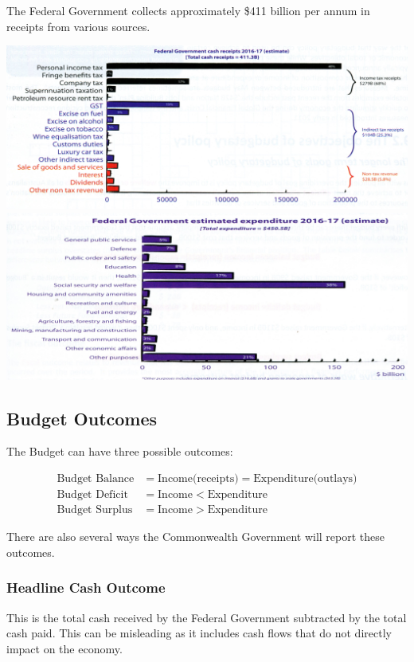 \documentclass[11pt]{article}
\begin{document}
The Federal Government collects approximately \$411 billion per annum
in receipts from various sources.

\includegraphics[width=.9\linewidth]{./images/Receipts.jpg}
\includegraphics[width=.9\linewidth]{./images/Expenditure.jpg}


\subsection{Budget Outcomes}
\label{sec-1-4}

The Budget can have three possible outcomes:


\begin{align*}
        \text{Budget Balance} &= \text{Income(receipts)} = \text{Expenditure(outlays)}\\
    \text{Budget Deficit} &= \text{Income} < \text{Expenditure}\\
    \text{Budget Surplus} &= \text{Income} > \text{Expenditure}
\end{align*}

There are also several ways the Commonwealth Government will report
these outcomes.

\subsubsection{Headline Cash Outcome}
\label{sec-1-4-1}

This is the total cash received by the Federal Government subtracted
by the total cash paid. This can be misleading as it includes cash
flows that do not directly impact on the economy.
\end{document}
